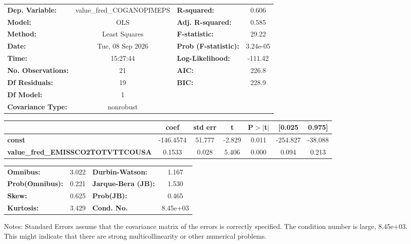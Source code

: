 \begin{center}
\begin{tabular}{lclc}
\toprule
\textbf{Dep. Variable:}                   & value\_fred\_COGANOPIMEPS & \textbf{  R-squared:         } &     0.606   \\
\textbf{Model:}                           &            OLS            & \textbf{  Adj. R-squared:    } &     0.585   \\
\textbf{Method:}                          &       Least Squares       & \textbf{  F-statistic:       } &     29.22   \\
\textbf{Date:}                            &      Tue, 08 Sep 2026     & \textbf{  Prob (F-statistic):} &  3.24e-05   \\
\textbf{Time:}                            &          15:27:44         & \textbf{  Log-Likelihood:    } &   -111.42   \\
\textbf{No. Observations:}                &               21          & \textbf{  AIC:               } &     226.8   \\
\textbf{Df Residuals:}                    &               19          & \textbf{  BIC:               } &     228.9   \\
\textbf{Df Model:}                        &                1          & \textbf{                     } &             \\
\textbf{Covariance Type:}                 &         nonrobust         & \textbf{                     } &             \\
\bottomrule
\end{tabular}
\begin{tabular}{lcccccc}
                                          & \textbf{coef} & \textbf{std err} & \textbf{t} & \textbf{P$> |$t$|$} & \textbf{[0.025} & \textbf{0.975]}  \\
\midrule
\textbf{const}                            &    -146.4574  &       51.777     &    -2.829  &         0.011        &     -254.827    &      -38.088     \\
\textbf{value\_fred\_EMISSCO2TOTVTTCOUSA} &       0.1533  &        0.028     &     5.406  &         0.000        &        0.094    &        0.213     \\
\bottomrule
\end{tabular}
\begin{tabular}{lclc}
\textbf{Omnibus:}       &  3.022 & \textbf{  Durbin-Watson:     } &    1.167  \\
\textbf{Prob(Omnibus):} &  0.221 & \textbf{  Jarque-Bera (JB):  } &    1.530  \\
\textbf{Skew:}          &  0.625 & \textbf{  Prob(JB):          } &    0.465  \\
\textbf{Kurtosis:}      &  3.429 & \textbf{  Cond. No.          } & 8.45e+03  \\
\bottomrule
\end{tabular}
\end{center}

Notes: \newline
 [1] Standard Errors assume that the covariance matrix of the errors is correctly specified. \newline
 [2] The condition number is large, 8.45e+03. This might indicate that there are \newline
 strong multicollinearity or other numerical problems.